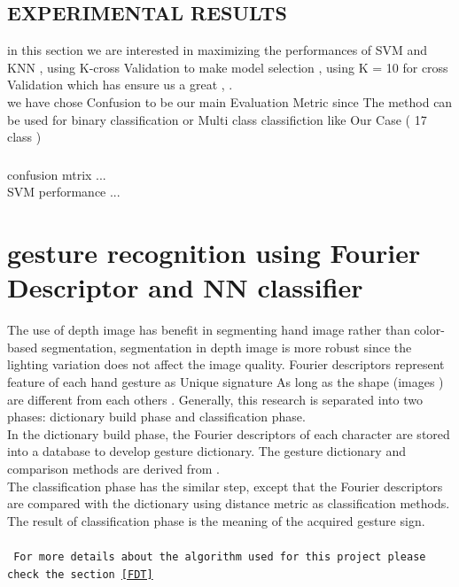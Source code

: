 \subsection{EXPERIMENTAL RESULTS }
in this section we are interested in maximizing the performances of SVM and KNN , using K-cross Validation to make model selection , using K = 10 for cross Validation which has ensure us a great    ,  . \\
we have chose Confusion to be our main Evaluation Metric since The method can be used for binary classification or Multi class classifiction like Our Case ( 17 class ) 

\subsubsection{ } 

confusion mtrix ...\\
SVM performance ...

\newpage





\section{gesture recognition using Fourier Descriptor and NN  classifier }

 The use of depth image has benefit
in segmenting hand image rather than color-based
segmentation, segmentation in depth image is more robust
since the lighting variation does not affect the image quality.
 Fourier descriptors represent feature of each hand gesture as Unique signature As long as the shape (images ) are different from each others .
Generally, this research is separated into two phases:
dictionary build phase and classification phase. \\In the
dictionary build phase, the Fourier descriptors of each
character are stored into a database to develop gesture
dictionary. The gesture dictionary and comparison methods are
derived from \cite{clif}.\\ The classification phase has the similar
step, except that the Fourier descriptors are compared with the
dictionary using distance metric as classification methods.
The result of classification phase is the meaning of the
acquired gesture sign.\\\\
\texttt{
For more details about the algorithm used for this project please check the section \ref{FDT}
}

